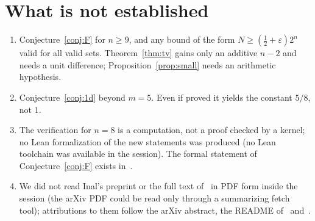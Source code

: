 \documentclass[11pt]{article}
\theoremstyle{definition}
\begin{document}
\section{What is not established}
\begin{enumerate}
\item Conjecture~\ref{conj:F} for $n\ge 9$, and any bound of the form $N\ge(\tfrac12+\varepsilon)2^n$ valid for all valid sets. Theorem~\ref{thm:tv} gains only an additive $n-2$ and needs a unit difference; Proposition~\ref{prop:small} needs an arithmetic hypothesis.
\item Conjecture~\ref{conj:1d} beyond $m=5$. Even if proved it yields the constant $5/8$, not $1$.
\item The verification for $n=8$ is a computation, not a proof checked by a kernel; no Lean formalization of the new statements was produced (no Lean toolchain was available in the session). The formal statement of Conjecture~\ref{conj:F} exists in~\cite{FC}.
\item We did not read Inal's preprint or the full text of~\cite{F} in PDF form inside the session (the arXiv PDF could be read only through a summarizing fetch tool); attributions to them follow the arXiv abstract, the README of~\cite{Frepo} and~\cite{Om}.
\end{enumerate}

\appendix
\end{document}
